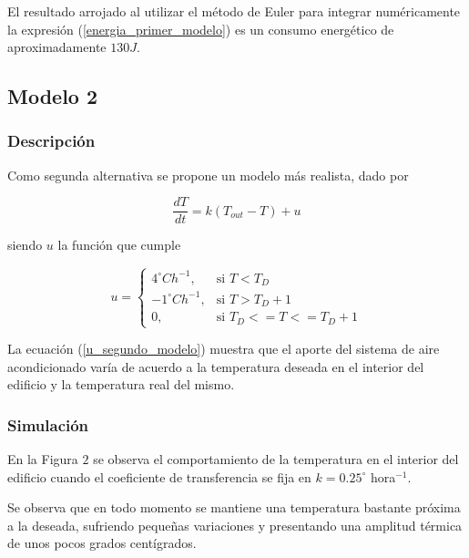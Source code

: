\documentclass{sig-alternate}
\begin{document}
El resultado arrojado al utilizar el m\'{e}todo de Euler para integrar 
num\'{e}ricamente la expresi\'{o}n (\ref{energia_primer_modelo}) es un 
consumo e\-ner\-g\'{e}\-ti\-co de aproximadamente $130J$.

\subsection{Modelo 2}

\subsubsection{Descripci\'{o}n}

Como segunda alternativa se propone un modelo m\'{a}s realista,
dado por

\begin{equation}
\label{segundo_modelo}
\frac{dT}{dt} = k ( T_{out} - T ) + u
\end{equation}

siendo $u$ la funci\'{o}n que cumple

\begin{equation}
\label{u_segundo_modelo}
u =  \begin{cases} 4^{\circ} C h^{-1}, & \mbox{si }  T < T_{D} \\
-1^{\circ} C h^{-1}, & \mbox{si }  T > T_{D} + 1 \\
0, & \mbox{si }  T_{D} <= T <= T_{D}+1 \end{cases}
\end{equation}

La ecuaci\'{o}n (\ref{u_segundo_modelo}) muestra que el aporte del
sistema de aire acondicionado var\'{i}a de acuerdo a la temperatura
deseada en el interior del edificio y la temperatura real del mismo.

\subsubsection{Simulaci\'{o}n}

En la Figura $2$ se observa el comportamiento
de la temperatura en el interior del edificio cuando el coeficiente de transferencia
se fija en $k = 0.25^{\circ}$ hora$^{-1}$.

Se observa que en todo momento se mantiene una temperatura bastante pr\'{o}xima
a la deseada, sufriendo peque\~{n}as variaciones y presentando una amplitud
t\'{e}rmica de unos pocos grados cent\'{i}grados.
\end{document}
